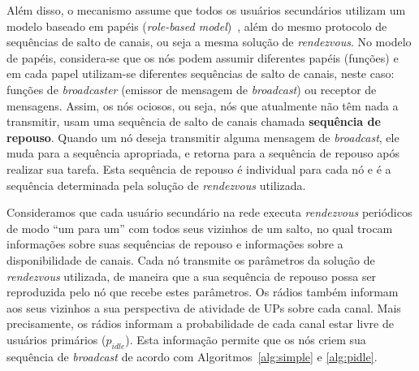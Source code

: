 Além disso, o mecanismo assume que todos os usuários secundários utilizam um modelo baseado em papéis ({\it role-based model})~\cite{mclock}, além do mesmo protocolo de sequências de salto de canais, ou seja a mesma solução de {\it rendezvous}. No modelo de papéis, considera-se que os nós podem assumir diferentes papéis (funções) e em cada papel utilizam-se diferentes sequências de salto de canais, neste caso: funções de {\it broadcaster} (emissor de mensagem de {\it broadcast}) ou receptor de mensagens. Assim, os nós ociosos, ou seja, nós que atualmente não têm nada a transmitir, usam uma sequência de salto de canais chamada {\bf sequência de repouso}. Quando um nó deseja transmitir alguma mensagem de {\it broadcast}, ele muda para a sequência apropriada, e retorna para a sequência de repouso após realizar sua tarefa. Esta sequência de repouso é individual para cada nó e é a sequência determinada pela solução de {\it rendezvous} utilizada. %



Consideramos que cada usuário secundário na rede executa {\it rendezvous} periódicos de modo ``um para um'' com todos seus vizinhos de um salto, no qual trocam informações sobre suas sequências de repouso e informações sobre a disponibilidade de canais. Cada nó transmite os parâmetros da solução de {\it rendezvous} utilizada, de maneira que a sua sequência de repouso possa ser reproduzida pelo nó que recebe estes parâmetros. Os rádios também informam aos seus vizinhos a sua perspectiva de atividade de UPs sobre cada canal. Mais precisamente, os rádios informam a probabilidade de cada canal estar livre de usuários primários ($p_{idle}$). Esta informação permite que os nós criem sua sequência de {\it broadcast} de acordo com Algoritmos~\ref{alg:simple} e \ref{alg:pidle}.



